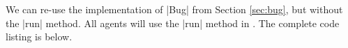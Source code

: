 We can re-use the implementation of |Bug| from Section \ref{sec:bug},
but without the |run| method.
All agents will use the |run| method in .
The complete code listing is below.


